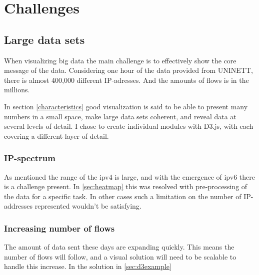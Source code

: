 \chapter{Challenges}
\label{chp:challenges} 
\section{Large data sets}
When visualizing big data the main challenge is to effectively show the core message of the data. Considering one hour of the data provided from UNINETT, there is almost 400,000 different IP-adresses. And the amounts of flows is in the millions. 

In section \ref{characteristics} good visualization is said to be able to present many numbers in a small space,  make large data sets coherent, and reveal data at several levels of detail. I chose to create individual modules with D3.js, with each covering a different layer of detail. 

\subsection{IP-spectrum}
As mentioned the range of the \gls{ipv4} is large, and with the emergence of \gls{ipv6} there is a challenge present. In \ref{sec:heatmap} this was resolved with pre-processing of the data for a specific task. In other cases such a limitation on the number of IP-addresses represented wouldn't be satisfying.  

\subsection{Increasing number of flows}
The amount of data sent these days are expanding quickly. This means the number of flows will follow, and a visual solution will need to be scalable to handle this increase. In the solution in \ref{sec:d3example}